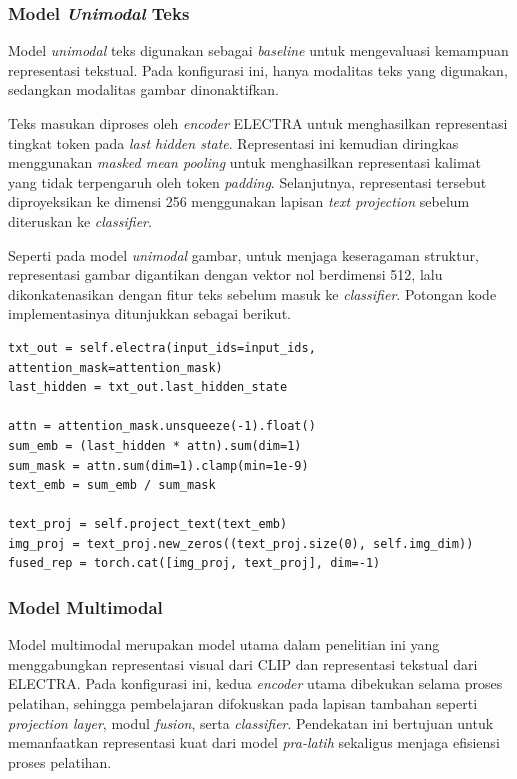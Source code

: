 \subsubsection{Model \textit{Unimodal} Teks}
\label{IV.Model.Konfigurasi.UnimodalTeks}

Model \textit{unimodal} teks digunakan sebagai \textit{baseline} untuk mengevaluasi kemampuan representasi tekstual. Pada konfigurasi ini, hanya modalitas teks yang digunakan, sedangkan modalitas gambar dinonaktifkan.

Teks masukan diproses oleh \textit{encoder} ELECTRA untuk menghasilkan representasi tingkat token pada \textit{last hidden state}. Representasi ini kemudian diringkas menggunakan \textit{masked mean pooling} untuk menghasilkan representasi kalimat yang tidak terpengaruh oleh token \textit{padding}. Selanjutnya, representasi tersebut diproyeksikan ke dimensi 256 menggunakan lapisan \textit{text projection} sebelum diteruskan ke \textit{classifier}.

Seperti pada model \textit{unimodal} gambar, untuk menjaga keseragaman struktur, representasi gambar digantikan dengan vektor nol berdimensi 512, lalu dikonkatenasikan dengan fitur teks sebelum masuk ke \textit{classifier}. Potongan kode implementasinya ditunjukkan sebagai berikut.

\begin{lstlisting}[caption={Kode implementasi model \textit{unimodal} teks}, label={code:4.unimodal_teks}]
txt_out = self.electra(input_ids=input_ids, attention_mask=attention_mask)
last_hidden = txt_out.last_hidden_state

attn = attention_mask.unsqueeze(-1).float()
sum_emb = (last_hidden * attn).sum(dim=1)
sum_mask = attn.sum(dim=1).clamp(min=1e-9)
text_emb = sum_emb / sum_mask

text_proj = self.project_text(text_emb)
img_proj = text_proj.new_zeros((text_proj.size(0), self.img_dim))
fused_rep = torch.cat([img_proj, text_proj], dim=-1)
\end{lstlisting}

\subsubsection{Model Multimodal}
\label{IV.Model.Konfigurasi.Multimodal}

Model multimodal merupakan model utama dalam penelitian ini yang menggabungkan representasi visual dari CLIP dan representasi tekstual dari ELECTRA. Pada konfigurasi ini, kedua \textit{encoder} utama dibekukan selama proses pelatihan, sehingga pembelajaran difokuskan pada lapisan tambahan seperti \textit{projection layer}, modul \textit{fusion}, serta \textit{classifier}. Pendekatan ini bertujuan untuk memanfaatkan representasi kuat dari model \textit{pra-latih} sekaligus menjaga efisiensi proses pelatihan.

